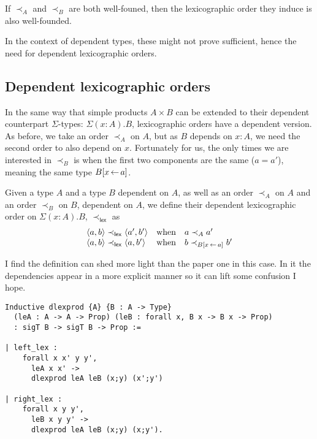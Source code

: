 \begin{lemma}
  If \(\prec_A\) and \(\prec_B\) are both well-founed, then the lexicographic
  order they induce is also well-founded.
\end{lemma}


In the context of dependent types, these might not prove sufficient, hence the
need for dependent lexicographic orders.

\subsection{Dependent lexicographic orders}

In the same way that simple products \(A \times B\) can be extended to their
dependent counterpart \(\Sigma\)-types: \(\Sigma (x:A). B\), lexicographic
orders have a dependent version.
As before, we take an order \(\prec_A\) on \(A\), but as \(B\) depends on
\(x : A\), we need the second order to also depend on \(x\). Fortunately for us,
the only times we are interested in \(\prec_B\) is when the first two components
are the same (\(a = a'\)), meaning the same type \(B[x \mathop{\leftarrow} a]\).

\begin{definition}
  Given a type \(A\) and a type \(B\) dependent on \(A\), as well as an order
  \(\prec_A\) on \(A\) and an order \(\prec_B\) on \(B\), dependent on \(A\),
  we define their dependent lexicographic order on \(\Sigma (x:A). B\),
  \(\prec_{\mathsf{lex}}\) as
  \[
    \begin{array}{lcl}
      \langle a,b \rangle \prec_{\mathsf{lex}} \langle a',b' \rangle &\text{when}&
      a \prec_A a' \\
      \langle a,b \rangle \prec_{\mathsf{lex}} \langle a,b' \rangle &\text{when}&
      b \prec_{B[x \mathop{\leftarrow} a]} b'
    \end{array}
  \]
\end{definition}

I find the \Coq definition can shed more light than the paper one in this case.
In it the dependencies appear in a more explicit manner so it can lift some
confusion I hope.

\begin{verbatim}
Inductive dlexprod {A} {B : A -> Type}
  (leA : A -> A -> Prop) (leB : forall x, B x -> B x -> Prop)
  : sigT B -> sigT B -> Prop :=

| left_lex :
    forall x x' y y',
      leA x x' ->
      dlexprod leA leB (x;y) (x';y')

| right_lex :
    forall x y y',
      leB x y y' ->
      dlexprod leA leB (x;y) (x;y').
\end{verbatim}

